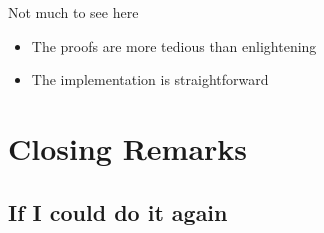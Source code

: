 \documentclass{beamer}
\begin{document}
\begin{frame}{Not much to see here}
\begin{itemize}
  \item The proofs are more tedious than enlightening
  \item The implementation is straightforward
\end{itemize}
\end{frame}


\section{Closing Remarks}

\subsection{If I could do it again}

\end{document}
